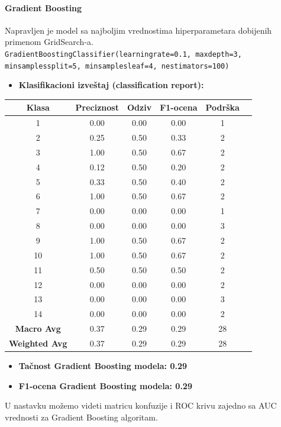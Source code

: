 \documentclass{article}
\begin{document}
\paragraph{Gradient Boosting}
\begin{flushleft}
Napravljen je model sa najboljim vrednostima hiperparametara  dobijenih primenom GridSearch-a. \\
\texttt{GradientBoostingClassifier(learning\textunderscore rate=0.1, 
max\textunderscore depth=3, min\textunderscore samples\textunderscore split=5, 
min\textunderscore samples\textunderscore leaf=4, n\textunderscore estimators=100)}


\begin{itemize}
\item \textbf{Klasifikacioni izveštaj (classification report):}
\end{itemize}

\begin{table}[ht]
    \centering*
    \begin{tabular}{cccccc}
        \textbf{Klasa} & \textbf{Preciznost} & \textbf{Odziv} & \textbf{F1-ocena} & \textbf{Podrška} \\
        \hline
        1 & 0.00 & 0.00 & 0.00 & 1 \\
        2 & 0.25 & 0.50 & 0.33 & 2 \\
        3 & 1.00 & 0.50 & 0.67 & 2 \\
        4 & 0.12 & 0.50 & 0.20 & 2 \\
        5 & 0.33 & 0.50 & 0.40 & 2 \\
        6 & 1.00 & 0.50 & 0.67 & 2 \\
        7 & 0.00 & 0.00 & 0.00 & 1 \\
        8 & 0.00 & 0.00 & 0.00 & 3 \\
        9 & 1.00 & 0.50 & 0.67 & 2 \\
        10 & 1.00 & 0.50 & 0.67 & 2 \\
        11 & 0.50 & 0.50 & 0.50 & 2 \\
        12 & 0.00 & 0.00 & 0.00 & 2 \\
        13 & 0.00 & 0.00 & 0.00 & 3 \\
        14 & 0.00 & 0.00 & 0.00 & 2 \\
        \hline
        \textbf{Macro Avg} & 0.37 & 0.29 & 0.29 & 28 \\
        \textbf{Weighted Avg} & 0.37 & 0.29 & 0.29 & 28 \\
    \end{tabular}

    \label{tab:classification-report}
\end{table}

\begin{itemize}
\item \textbf{Tačnost Gradient Boosting modela: 0.29}
\item \textbf{F1-ocena Gradient Boosting modela: 0.29}
\end{itemize}


\vspace{3mm}
U nastavku možemo videti matricu konfuzije i ROC krivu zajedno sa AUC vrednosti za Gradient Boosting algoritam.
\end{flushleft}
\end{document}
